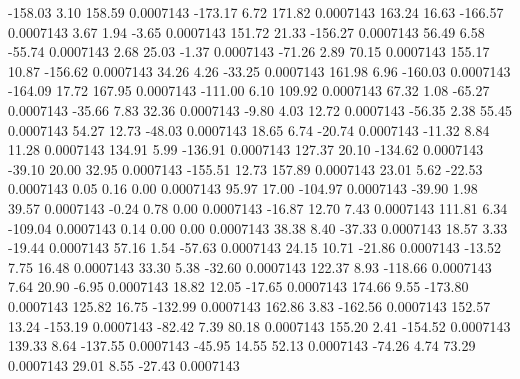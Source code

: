      -158.03        3.10      158.59     0.0007143
     -173.17        6.72      171.82     0.0007143
      163.24       16.63     -166.57     0.0007143
        3.67        1.94       -3.65     0.0007143
      151.72       21.33     -156.27     0.0007143
       56.49        6.58      -55.74     0.0007143
        2.68       25.03       -1.37     0.0007143
      -71.26        2.89       70.15     0.0007143
      155.17       10.87     -156.62     0.0007143
       34.26        4.26      -33.25     0.0007143
      161.98        6.96     -160.03     0.0007143
     -164.09       17.72      167.95     0.0007143
     -111.00        6.10      109.92     0.0007143
       67.32        1.08      -65.27     0.0007143
      -35.66        7.83       32.36     0.0007143
       -9.80        4.03       12.72     0.0007143
      -56.35        2.38       55.45     0.0007143
       54.27       12.73      -48.03     0.0007143
       18.65        6.74      -20.74     0.0007143
      -11.32        8.84       11.28     0.0007143
      134.91        5.99     -136.91     0.0007143
      127.37       20.10     -134.62     0.0007143
      -39.10       20.00       32.95     0.0007143
     -155.51       12.73      157.89     0.0007143
       23.01        5.62      -22.53     0.0007143
        0.05        0.16        0.00     0.0007143
       95.97       17.00     -104.97     0.0007143
      -39.90        1.98       39.57     0.0007143
       -0.24        0.78        0.00     0.0007143
      -16.87       12.70        7.43     0.0007143
      111.81        6.34     -109.04     0.0007143
        0.14        0.00        0.00     0.0007143
       38.38        8.40      -37.33     0.0007143
       18.57        3.33      -19.44     0.0007143
       57.16        1.54      -57.63     0.0007143
       24.15       10.71      -21.86     0.0007143
      -13.52        7.75       16.48     0.0007143
       33.30        5.38      -32.60     0.0007143
      122.37        8.93     -118.66     0.0007143
        7.64       20.90       -6.95     0.0007143
       18.82       12.05      -17.65     0.0007143
      174.66        9.55     -173.80     0.0007143
      125.82       16.75     -132.99     0.0007143
      162.86        3.83     -162.56     0.0007143
      152.57       13.24     -153.19     0.0007143
      -82.42        7.39       80.18     0.0007143
      155.20        2.41     -154.52     0.0007143
      139.33        8.64     -137.55     0.0007143
      -45.95       14.55       52.13     0.0007143
      -74.26        4.74       73.29     0.0007143
       29.01        8.55      -27.43     0.0007143
